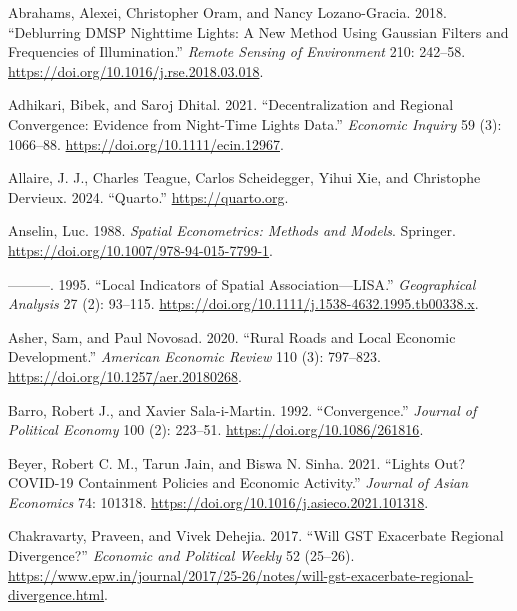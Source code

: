 \documentclass[
  letterpaper,
  DIV=11,
  numbers=noendperiod]{scrartcl}
\newlength{\cslhangindent}
\newenvironment{CSLReferences}[2] %
 {\begin{list}{}{%
  \setlength{\itemindent}{0pt}
  \setlength{\leftmargin}{0pt}
  \setlength{\parsep}{0pt}
  \ifodd #1
   \setlength{\leftmargin}{\cslhangindent}
   \setlength{\itemindent}{-1\cslhangindent}
  \fi
  \setlength{\itemsep}{#2\baselineskip}}}
 {\end{list}}
\begin{document}
\label{refs}
\begin{CSLReferences}{1}{0}
Abrahams, Alexei, Christopher Oram, and Nancy Lozano-Gracia. 2018.
{``Deblurring DMSP Nighttime Lights: A New Method Using Gaussian Filters
and Frequencies of Illumination.''} \emph{Remote Sensing of Environment}
210: 242--58. \url{https://doi.org/10.1016/j.rse.2018.03.018}.

Adhikari, Bibek, and Saroj Dhital. 2021. {``Decentralization and
Regional Convergence: Evidence from Night-Time Lights Data.''}
\emph{Economic Inquiry} 59 (3): 1066--88.
\url{https://doi.org/10.1111/ecin.12967}.

Allaire, J. J., Charles Teague, Carlos Scheidegger, Yihui Xie, and
Christophe Dervieux. 2024. {``Quarto.''} \url{https://quarto.org}.

Anselin, Luc. 1988. \emph{Spatial Econometrics: Methods and Models}.
Springer. \url{https://doi.org/10.1007/978-94-015-7799-1}.

---------. 1995. {``Local Indicators of Spatial Association---{LISA}.''}
\emph{Geographical Analysis} 27 (2): 93--115.
\url{https://doi.org/10.1111/j.1538-4632.1995.tb00338.x}.

Asher, Sam, and Paul Novosad. 2020. {``Rural Roads and Local Economic
Development.''} \emph{American Economic Review} 110 (3): 797--823.
\url{https://doi.org/10.1257/aer.20180268}.

Barro, Robert J., and Xavier Sala-i-Martin. 1992. {``Convergence.''}
\emph{Journal of Political Economy} 100 (2): 223--51.
\url{https://doi.org/10.1086/261816}.

Beyer, Robert C. M., Tarun Jain, and Biswa N. Sinha. 2021. {``Lights
Out? COVID-19 Containment Policies and Economic Activity.''}
\emph{Journal of Asian Economics} 74: 101318.
\url{https://doi.org/10.1016/j.asieco.2021.101318}.

Chakravarty, Praveen, and Vivek Dehejia. 2017. {``Will {GST} Exacerbate
Regional Divergence?''} \emph{Economic and Political Weekly} 52
(25--26).
\url{https://www.epw.in/journal/2017/25-26/notes/will-gst-exacerbate-regional-divergence.html}.


\end{CSLReferences}
\end{document}
